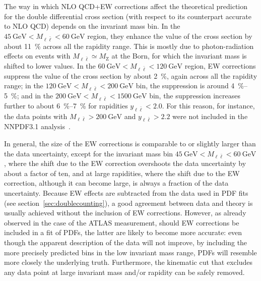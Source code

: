 The way in which NLO QCD+EW corrections affect the theoretical prediction for
the double differential cross section (with respect to its counterpart accurate
to NLO QCD) depends on the invariant mass bin. In the
$\SI{45}{\giga\electronvolt}<M_{\ell\bar\ell}<\SI{60}{\giga\electronvolt}$ region, they enhance the value of the cross
section by about \SI{11}{\percent} across all the rapidity range. This is mostly due to photon-radiation effects
on events with $M_{\ell\bar\ell}\simeq M_\mathrm{Z}$ at the Born, for which the invariant mass is shifted to lower 
values. In the 
$\SI{60}{\giga\electronvolt}<M_{\ell\bar\ell}<\SI{120}{\giga\electronvolt}$ region, EW corrections suppress the value of the cross
section by about \SI{2}{\percent}, again across all the rapidity range; in the
$\SI{120}{\giga\electronvolt}<M_{\ell\bar\ell}<\SI{200}{\giga\electronvolt}$ bin, the suppression is around \SIrange{4}{5}{\percent}; and in
the $\SI{200}{\giga\electronvolt}<M_{\ell\bar\ell}<\SI{1500}{\giga\electronvolt}$ bin, the suppression increases further to
about \SIrange{6}{7}{\percent} for rapidities $y_{\ell\bar\ell}<2.0$. For this reason, for instance, the data points with
$M_{\ell\bar\ell}>\SI{200}{\giga\electronvolt}$ and $y_{\ell\bar\ell}>2.2$ were not included in the
NNPDF3.1 analysis~\cite{Ball:2017nwa}.

In general, the size of the EW corrections is comparable to or slightly larger
than the data uncertainty, except for the invariant mass bin 
$\SI{45}{\giga\electronvolt}<M_{\ell\bar\ell}<\SI{60}{\giga\electronvolt}$,
where the shift due to the EW correction overshoots the data uncertainty by
about a factor of ten, and at large rapidities, where the shift due to the EW
correction, although it can become large, is always a fraction of the data
uncertainty. Because EW effects are subtracted from the data used
in PDF fits (see section~\ref{sec:doublecounting}), a good agreement between
data and theory is usually achieved without the inclusion of EW corrections.
However, as already observed in the case of the ATLAS measurement, should EW
corrections be included in a fit of PDFs, the latter are likely to become more
accurate: even though the apparent description of the data will not
improve, by including the more precisely predicted bins in the low invariant mass range, PDFs
will resemble more closely the underlying truth. Furthermore, the kinematic cut
that excludes any data point at large invariant mass and/or rapidity can be
safely removed.

